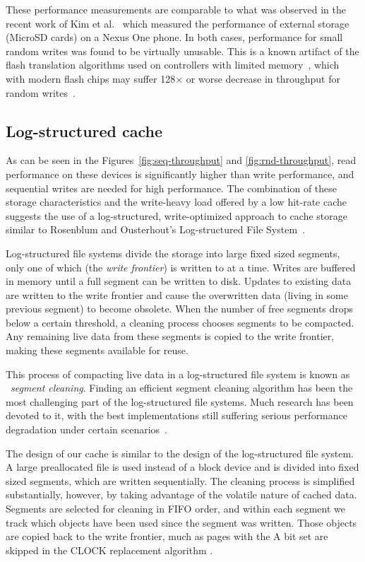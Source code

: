 \documentclass[letterpaper,twocolumn,10pt]{article}
\begin{document}
These performance measurements are comparable to what was observed in the
recent work of Kim et al.~\cite{kim12} which measured the performance of
external storage (MicroSD cards) on a Nexus One
phone.  In both cases, performance for small random writes was found
to be virtually unusable.  This is a known artifact of the flash translation
algorithms used on controllers with limited memory~\cite{Kim2002:FTL}, which
with modern flash chips may suffer 128$\times$ or worse decrease in throughput for
random writes~\cite{boboila_performance_2011}.

\subsection{Log-structured cache}
As can be seen in the Figures~\ref{fig:seq-throughput} and
\ref{fig:rnd-throughput}, read performance on these devices is
significantly higher than write performance, and sequential writes are
needed for high performance.
The combination of these storage characteristics and the write-heavy load
offered by a low hit-rate cache suggests the use of a log-structured,
write-optimized approach to cache storage similar to Rosenblum and Ousterhout's
Log-structured File System~\cite{rosenblum92}.

Log-structured file systems divide the storage into large fixed sized segments,
only one of which (the \emph{write frontier}) is written to at a time.  Writes
are buffered in memory until a full segment can be written to disk.  Updates to
existing data are written to the write frontier and cause the overwritten data
(living in some previous segment) to become obsolete.  When the number of free
segments drops below a certain threshold, a cleaning process chooses segments to
be compacted.  Any remaining live data from these segments is copied to the
write frontier, making these segments available for reuse.

This process of compacting live data in a log-structured file system is known as
~\emph{segment cleaning}.  Finding an efficient segment cleaning algorithm has
been the most challenging part of the log-structured file systems.  Much
research has been devoted to it, with the best implementations still suffering serious
performance degradation under certain scenarios~\cite{seltzer93}.

The design of our cache is similar to the design of the log-structured file
system.  A large preallocated file is used instead of a block device and is
divided into fixed sized segments, which are written sequentially. The
cleaning process is simplified substantially, however, by taking
advantage of the volatile nature of cached data. Segments are selected
for cleaning in FIFO order, and within each segment we track which
objects have been used since the segment was written. Those objects
are copied back to the write frontier, much as pages with the A bit
set are skipped in the CLOCK replacement algorithm \cite{corbato_paging_1969}.
\end{document}
